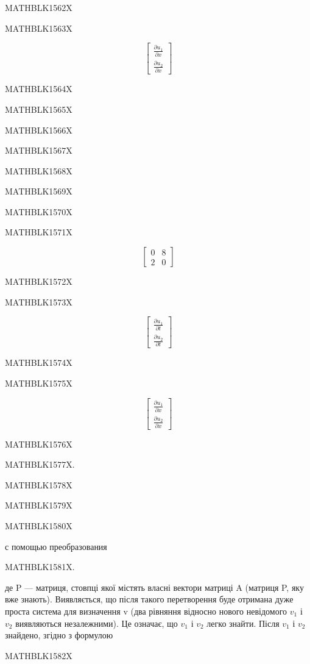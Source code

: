 \documentclass[
  ukrainian,
]{article}
\begin{document}
MATHBLK1562X

MATHBLK1563X

\[
\begin{bmatrix} \frac{\partial u_1}{\partial x} \\ \frac{\partial u_2}{\partial x} \end{bmatrix}
\]

MATHBLK1564X

MATHBLK1565X

MATHBLK1566X

MATHBLK1567X

MATHBLK1568X

MATHBLK1569X

MATHBLK1570X

MATHBLK1571X

\[
\begin{bmatrix} 0 & 8 \\ 2 & 0 \end{bmatrix}
\]

MATHBLK1572X

MATHBLK1573X

\[
\begin{bmatrix} \frac{\partial u_1}{\partial t} \\ \frac{\partial u_2}{\partial t} \end{bmatrix}
\]

MATHBLK1574X

MATHBLK1575X

\[
\begin{bmatrix} \frac{\partial u_1}{\partial x} \\ \frac{\partial u_2}{\partial x} \end{bmatrix}
\]

MATHBLK1576X

MATHBLK1577X.

MATHBLK1578X

MATHBLK1579X

MATHBLK1580X

с помощью преобразования

MATHBLK1581X.

де P --- матриця, стовпці якої містять власні вектори матриці A (матриця
P, яку вже знають). Виявляється, що після такого перетворення буде
отримана дуже проста система для визначення v (два рівняння відносно
нового невідомого \(v_1\) і \(v_2\) виявляються незалежними). Це
означає, що \(v_1\) і \(v_2\) легко знайти. Після \(v_1\) і \(v_2\)
знайдено, згідно з формулою

MATHBLK1582X
\end{document}

